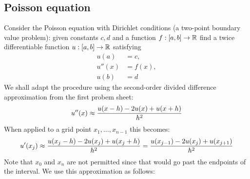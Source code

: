 \subsection{Poisson equation}
Consider the Poisson equation with Dirichlet conditions (a two-point boundary value problem): given constants $c,d$ and a function $f : [a,b] \rightarrow {\mathbb R}$ find a twice differentiable function $u : [a,b] \rightarrow {\mathbb R}$ satisfying
\begin{align*}
u(a) &= c, \\
u''(x) &= f(x), \\
u(b) &= d
\end{align*}
We shall adapt the procedure using the second-order divided difference approximation from the first probem sheet:
\[
u''(x) \ensuremath{\approx} {u(x-h) - 2u(x) + u(x+h)\over h^2}
\]
When applied to a grid point $x_1,\ensuremath{\ldots},x_{n-1}$ this becomes:
\[
u'(x_j) \ensuremath{\approx} {u(x_j-h) - 2u(x_j) + u(x_j+h)\over h^2} = {u(x_{j-1}) - 2u(x_j) + u(x_{j+1})\over h^2}
\]
Note that $x_0$ and $x_n$ are not permitted since that would go past the endpoints of the interval. We use this approximation as follows:

